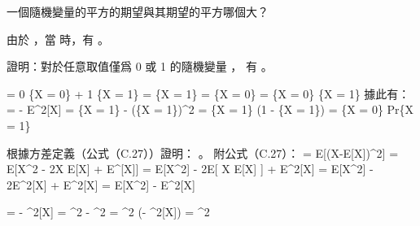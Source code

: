 \startEXERCISE
一個隨機變量的平方的期望與其期望的平方哪個大？
\stopEXERCISE

\startANSWER
由於 ，當  時，有 。
\stopANSWER

\startEXERCISE
證明：對於任意取值僅爲 0 或 1 的隨機變量 ，
有 \m{\Var[X] = \E[X] \E[1-X]}。
\stopEXERCISE

\startANSWER
\startformula\startmathalignment
\NC \E[X] \NC = 0 \cdot \Pr\{X = 0\} + 1 \cdot \Pr\{X = 1\} = \Pr\{X = 1\} \NR
\NC \E[1-X] \NC = \Pr\{X = 0\} \NR
\NC \E[X]\E[1-X] \NC = \Pr\{X = 0\} \cdot \Pr\{X = 1\} \NR
\stopmathalignment\stopformula
據此有：
\startformula\startmathalignment
\NC \Var[X]
    \NC = \E[X^2] - E^2[X] = \Pr\{X = 1\} - (\Pr\{X = 1\})^2 \NR
\NC \NC = \Pr\{X = 1\} (1 - \Pr\{X = 1\}) \NR
\NC \NC = \Pr\{X = 0\} \cdot Pr\{X = 1\} \NR
\stopmathalignment\stopformula
\stopANSWER

\startEXERCISE
根據方差定義（公式（C.27））證明： \m{\Var[\alpha X] = \alpha^2\Var[X]}。
附公式（C.27）：
\startformula\startmathalignment
\NC \Var[X]
    \NC = E[(X-E[X])^2] \NR
\NC \NC = E[X^2 - 2X E[X] + E^[X]] \NR
\NC \NC = E[X^2] - 2E[ X E[X] ] + E^2[X] \NR
\NC \NC = E[X^2] - 2E^2[X] + E^2[X] \NR
\NC \NC = E[X^2] - E^2[X] \NR
\stopmathalignment\stopformula
\stopEXERCISE

\startANSWER
\startformula\startmathalignment
\NC \Var[\alpha X]
    \NC = \E[\alpha^2 X^2] - \E^2[\alpha X] \NR
\NC \NC = \alpha^2 \E[X^2] - \alpha^2\E[X] \NR
\NC \NC = \alpha^2 (\E[X^2] - \E^2[X]) \NR
\NC \NC = \alpha^2 \Var[X] \NR
\stopmathalignment\stopformula
\stopANSWER

\stopsection
